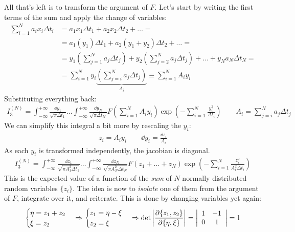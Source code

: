 \documentclass[../template.tex]{subfiles}
\begin{document}
All that's left is to transform the argument of $F$. Let's start by writing the first terms of the sum and apply the change of variables:
\begin{align}\nonumber
    \sum_{i=1}^N a_i x_i \Delta t_i &= a_1 x_1 \Delta t_1 + a_2 x_2 \Delta t_2 + \dots = \\ \nonumber
    &= a_1(y_1) \Delta t_1 + a_2(y_1 + y_2) \Delta t_2 + \dots =\\ \nonumber
    &= y_1\left(\sum_{j=1}^N a_j \Delta t_j\right) + y_2\left(\sum_{j=2}^N a_j \Delta t_j\right) + \dots + y_N a_N \Delta t_N =\\
    &= \sum_{i=1}^N y_i \underbrace{\left(\sum_{j=i}^N a_j \Delta t_j\right)}_{A_i} \equiv \sum_{i=1}^N A_i y_i \label{eqn:Ai}
\end{align} 
Substituting everything back:
\begin{align*}
    I_3^{(N)} = \int_{-\infty}^{+\infty} \frac{\dd{y_1}}{\sqrt{\pi \Delta t_1}} \dots \int_{-\infty}^{+\infty} \frac{\dd{y_N}}{\sqrt{\pi \Delta t_N}} F\left(\sum_{i=1}^N A_i y_i\right) \exp\left(-\sum_{i=1}^N \frac{y_i^2}{\Delta t_i} \right) \qquad A_i = \sum_{j=i}^N a_j \Delta t_j
\end{align*}
We can simplify this integral a bit more by rescaling the $y_i$:
\begin{align*}
    z_i = A_i y_i\qquad \dd{y_i} = \frac{\dd{z_i}}{A_i} 
\end{align*} 
As each $y_i$ is transformed independently, the jacobian is diagonal.
\begin{align*}
    I_3^{(N)} = \int_{-\infty}^{+\infty} \frac{\dd{z_1}}{\sqrt{\pi A_1^2 \Delta t_1}} \dots \int_{-\infty}^{+\infty} \frac{\dd{z_N}}{\sqrt{ \pi A_N^2 \Delta t_N}} F(z_1 +\dots + z_N) \exp\left(-\sum_{i=1}^N \frac{z_i^2}{A_i^2 \Delta t_i} \right)  
\end{align*}
This is the expected value of a function of the \textit{sum} of $N$ normally distributed random variables $\{z_i\}$. The idea is now to \textit{isolate} one of them from the argument of $F$, integrate over it, and reiterate. This is done by changing variables yet again:
\begin{align*}
    \begin{cases}
        \eta = z_1 + z_2\\
        \xi = z_2
    \end{cases} \Rightarrow \begin{cases}
        z_1 = \eta - \xi\\
        z_2 = \xi
    \end{cases} \Rightarrow \operatorname{det} \left|\pdv{\{z_1,z_2\}}{\{\eta,\xi\}}\right| = \left|\begin{array}{cc}
    1 & -1 \\ 
    0 & 1
    \end{array}\right| = 1
\end{align*}     
\end{document}
